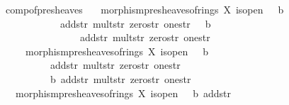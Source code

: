 \documentclass[12pt]{scrartcl}
\begin{document}
\begin{isabelle}
\isamarkupfalse%
\ comp{\isacharunderscore}{\kern0pt}of{\isacharunderscore}{\kern0pt}presheaves{\isacharcolon}{\kern0pt}\isanewline
\ \ \ {\isachardoublequoteopen}morphism{\isacharunderscore}{\kern0pt}presheaves{\isacharunderscore}{\kern0pt}of{\isacharunderscore}{\kern0pt}rings\ X\ is{\isacharunderscore}{\kern0pt}open\ {\isasymFF}\ {\isasymrho}\ b\ \isanewline
\ \ \ \ \ \ \ \ \ \ \ \ add{\isacharunderscore}{\kern0pt}str\ mult{\isacharunderscore}{\kern0pt}str\ zero{\isacharunderscore}{\kern0pt}str\ one{\isacharunderscore}{\kern0pt}str\ {\isasymFF}{\isacharprime}{\kern0pt}\ {\isasymrho}{\isacharprime}{\kern0pt}\ b{\isacharprime}{\kern0pt}\ \isanewline
\ \ \ \ \ \ \ \ \ \ \ \ \ \ \ \ add{\isacharunderscore}{\kern0pt}str{\isacharprime}{\kern0pt}\ mult{\isacharunderscore}{\kern0pt}str{\isacharprime}{\kern0pt}\ zero{\isacharunderscore}{\kern0pt}str{\isacharprime}{\kern0pt}\ one{\isacharunderscore}{\kern0pt}str{\isacharprime}{\kern0pt}\ {\isasymphi}{\isachardoublequoteclose}\isanewline
\ \ \ \ \ {\isachardoublequoteopen}morphism{\isacharunderscore}{\kern0pt}presheaves{\isacharunderscore}{\kern0pt}of{\isacharunderscore}{\kern0pt}rings\ X\ is{\isacharunderscore}{\kern0pt}open\ {\isasymFF}{\isacharprime}{\kern0pt}\ {\isasymrho}{\isacharprime}{\kern0pt}\ b{\isacharprime}{\kern0pt}\isanewline
\ \ \ \ \ \ \ \ \ \ add{\isacharunderscore}{\kern0pt}str{\isacharprime}{\kern0pt}\ mult{\isacharunderscore}{\kern0pt}str{\isacharprime}{\kern0pt}\ zero{\isacharunderscore}{\kern0pt}str{\isacharprime}{\kern0pt}\ one{\isacharunderscore}{\kern0pt}str{\isacharprime}{\kern0pt}\ {\isasymFF}{\isacharprime}{\kern0pt}{\isacharprime}{\kern0pt}\ {\isasymrho}{\isacharprime}{\kern0pt}{\isacharprime}{\kern0pt}\ \isanewline
\ \ \ \ \ \ \ \ \ \ b{\isacharprime}{\kern0pt}{\isacharprime}{\kern0pt}\ add{\isacharunderscore}{\kern0pt}str{\isacharprime}{\kern0pt}{\isacharprime}{\kern0pt}\ mult{\isacharunderscore}{\kern0pt}str{\isacharprime}{\kern0pt}{\isacharprime}{\kern0pt}\ zero{\isacharunderscore}{\kern0pt}str{\isacharprime}{\kern0pt}{\isacharprime}{\kern0pt}\ one{\isacharunderscore}{\kern0pt}str{\isacharprime}{\kern0pt}{\isacharprime}{\kern0pt}\ {\isasymphi}{\isacharprime}{\kern0pt}{\isachardoublequoteclose}\isanewline
\ \ \ {\isachardoublequoteopen}morphism{\isacharunderscore}{\kern0pt}presheaves{\isacharunderscore}{\kern0pt}of{\isacharunderscore}{\kern0pt}rings\ X\ is{\isacharunderscore}{\kern0pt}open\ {\isasymFF}\ {\isasymrho}\ b\ add{\isacharunderscore}{\kern0pt}str\isanewline

\end{isabelle}
\end{document}
